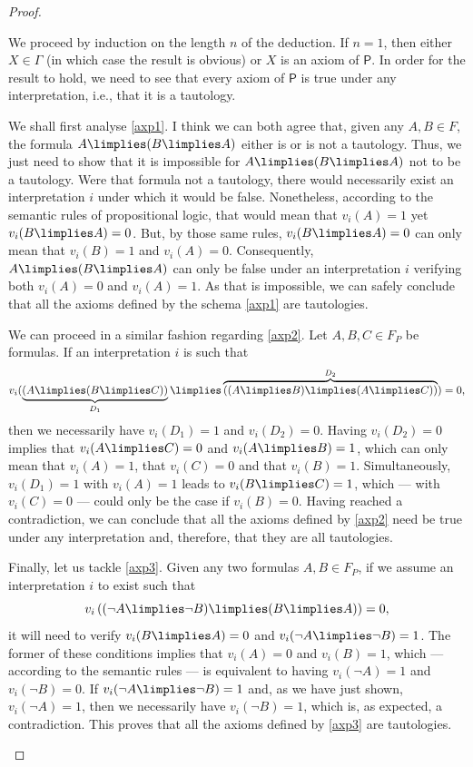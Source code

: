 \begin{proof}
\begin{parlist}
\item We proceed by induction on the length $n$ of the deduction.
If $n = 1$, then either $X \in \Gamma$ (in which case the result is obvious) or $X$ is an axiom of $\mathsf{P}$.
In order for the result to hold, we need to see that every axiom of $\mathsf{P}$ is true under any interpretation, i.e., that it is a tautology.

We shall first analyse \ref{axp1}.
I think we can both agree that, given any $A,B\in F$, the formula $A\limplies (B\limplies A)$ either is or is not a tautology.
Thus, we just need to show that it is impossible for $A\limplies (B\limplies A)$ not to be a tautology.
Were that formula not a tautology, there would necessarily exist an interpretation $i$ under which it would be false.
Nonetheless, according to the semantic rules of propositional logic, that would mean that $v_i(A) = 1$ yet $v_i(B\limplies A) = 0$.
But, by those same rules, $v_i(B\limplies A) = 0$ can only mean that $v_i(B) = 1$ and $v_i(A) = 0$.
Consequently, $A\limplies (B\limplies A)$ can only be false under an interpretation $i$ verifying both $v_i(A) = 0$ and $v_i(A) = 1$.
As that is impossible, we can safely conclude that all the axioms defined by the schema \ref{axp1} are tautologies.

We can proceed in a similar fashion regarding \ref{axp2}.
Let $A,B,C\in F_P$ be formulas.
If an interpretation $i$ is such that
\[ v_i( \underbrace{(A\limplies(B\limplies C))}_{D_1} \limplies \overbrace{((A\limplies B) \limplies (A\limplies C))}^{D_2}) = 0,\]
then we necessarily have $v_i(D_1) = 1$ and $v_i(D_2) = 0$.
Having $v_i(D_2) = 0$ implies that $v_i(A\limplies C) = 0$ and $v_i(A\limplies B) = 1$, which can only mean that $v_i(A) = 1$, that $v_i(C) = 0$ and that $v_i(B) = 1$.
Simultaneously, $v_i(D_1) = 1$ with $v_i(A) = 1$ leads to $v_i(B\limplies C) = 1$, which --- with $v_i(C) = 0$ --- could only be the case if $v_i(B) = 0$.
Having reached a contradiction, we can conclude that all the axioms defined by \ref{axp2} need be true under any interpretation and, therefore, that they are all tautologies.

Finally, let us tackle \ref{axp3}. Given any two formulas $A,B\in F_P$, if we assume an interpretation $i$ to exist such that
\[ v_i\left( (\lnot A \limplies \lnot B) \limplies (B \limplies A) \right) = 0,\]
it will need to verify $v_i(B \limplies A) = 0$ and $v_i(\lnot A\limplies \lnot B) = 1$.
The former of these conditions implies that $v_i(A) = 0$ and $v_i(B) = 1$, which --- according to the semantic rules --- is equivalent to having $v_i(\lnot A) = 1$ and $v_i(\lnot B) = 0$. If $v_i(\lnot A\limplies \lnot B) = 1$ and, as we have just shown, $v_i(\lnot A) = 1$, then we necessarily have $v_i(\lnot B) = 1$, which is, as expected, a contradiction.
This proves that all the axioms defined by \ref{axp3} are tautologies.


\end{parlist}
\end{proof}
